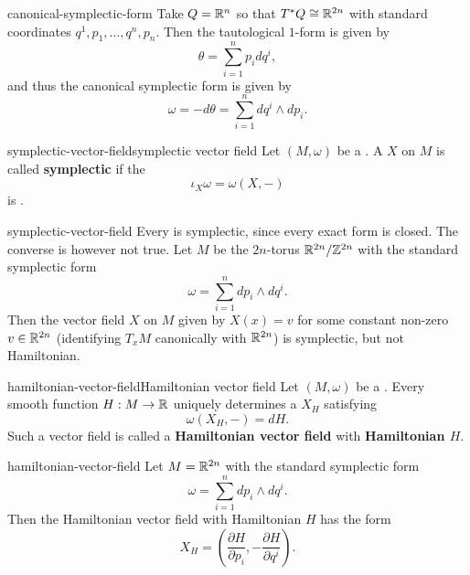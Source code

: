 \begin{example}{canonical-symplectic-form}
    Take $Q = \mathbb{R}^n$ so that $T^* Q \cong \mathbb{R}^{2n}$ with standard coordinates $q^1, p_1, \ldots, q^n, p_n$. Then the tautological $1$-form is given by
    \[ \theta = \sum_{i = 1}^{n} p_i dq^i , \]
    and thus the canonical symplectic form is given by
    \[ \omega = -d \theta = \sum_{i = 1}^{n} d q^i \wedge d p_i. \]
\end{example}

\begin{topic}{symplectic-vector-field}{symplectic vector field}
    Let $(M, \omega)$ be a . A  $X$ on $M$ is called \textbf{symplectic} if the 
    \[ \iota_X \omega = \omega(X, -) \]
    is .
\end{topic}

\begin{example}{symplectic-vector-field}
    Every  is symplectic, since every exact form is closed. The converse is however not true. Let $M$ be the $2n$-torus $\mathbb{R}^{2n}/\mathbb{Z}^{2n}$ with the standard symplectic form
    \[ \omega = \sum_{i = 1}^{n} dp_i \wedge dq^i . \]
    Then the vector field $X$ on $M$ given by $X(x) = v$ for some constant non-zero $v \in \mathbb{R}^{2n}$ (identifying $T_x M$ canonically with $\mathbb{R}^{2n}$) is symplectic, but not Hamiltonian.
\end{example}

\begin{topic}{hamiltonian-vector-field}{Hamiltonian vector field}
    Let $(M, \omega)$ be a . Every smooth function $H : M \to \mathbb{R}$ uniquely determines a  $X_H$ satisfying
    \[ \omega(X_H, -) = dH . \]
    Such a vector field is called a \textbf{Hamiltonian vector field} with \textbf{Hamiltonian $H$}.
\end{topic}

\begin{example}{hamiltonian-vector-field}
    Let $M = \mathbb{R}^{2n}$ with the standard symplectic form
    \[ \omega = \sum_{i = 1}^{n} dp_i \wedge dq^i . \]
    Then the Hamiltonian vector field with Hamiltonian $H$ has the form
    \[ X_H = \left(\frac{\partial H}{\partial p_i}, -\frac{\partial H}{\partial q^i} \right) . \]
\end{example}

